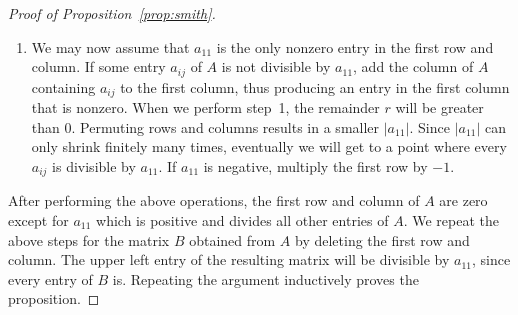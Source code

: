 \begin{proof}[Proof of Proposition~\ref{prop:smith}]
\begin{enumerate}
	\item We may now assume that $a_{11}$ is the only nonzero entry in the
	first row and column.  If some entry $a_{ij}$ of $A$ is not divisible
	by $a_{11}$, add the column of $A$ containing $a_{ij}$ to the first
	column, thus producing an entry in the first column that is nonzero.
	When we perform step~1, the remainder $r$ will be greater than $0$.
	Permuting rows and columns results in a smaller $|a_{11}|$.  Since
	$|a_{11}|$ can only shrink finitely many times, eventually we will get
	to a point where every $a_{ij}$ is divisible by $a_{11}$.  If $a_{11}$
	is negative, multiply the first row by $-1$.
\end{enumerate}
After performing the above operations, the first row and column
of $A$ are zero except for $a_{11}$ which is positive and divides
all other entries of $A$.  We repeat the above steps for the
matrix $B$ obtained from $A$ by deleting the first row and column.
The upper left entry of the resulting matrix will be divisible by
$a_{11}$, since every entry of $B$ is.  Repeating the argument
inductively proves the proposition.
\end{proof}

